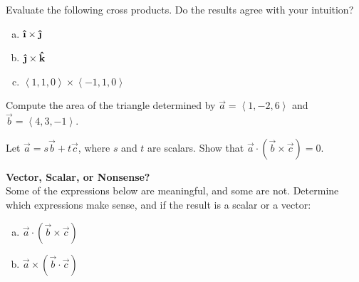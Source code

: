 \begin{list}{\bf{Problem : }}{}

\item  Evaluate the following cross products.  Do the results agree with your intuition?

\begin{enumerate}[a)]

\item \(\ihat \times \jhat\)

\vfill

\item \(\jhat \times \khat\)

\vfill

\item \(\left\langle 1, 1, 0\right\rangle \times \left\langle -1, 1, 0\right\rangle\)

\vfill

\end{enumerate}


\item Compute the area of the triangle determined by \(\vec{a} = \left\langle 1, -2, 6\right\rangle\) and \(\vec{b} = \left\langle 4, 3, -1\right\rangle\).

\vfill



\item  Let \(\vec{a} = s\vec{b}+t\vec{c}\), where \(s\) and \(t\) are scalars.
  Show that \(\vec{a}\cdot (\vec{b} \times \vec{c}) = 0\).

\vfill


\item \textbf{Vector, Scalar, or Nonsense?}\\Some of the expressions below are meaningful, and some are not.  Determine which expressions make sense, and if the result is a scalar or a vector:

\begin{enumerate}[a)]

\item \(\vec{a} \cdot (\vec{b} \times \vec{c})\)
\vspace*{.25in}

\item \(\vec{a} \times (\vec{b} \cdot \vec{c})\)
\vspace*{.25in}


\end{enumerate}
\end{list}
